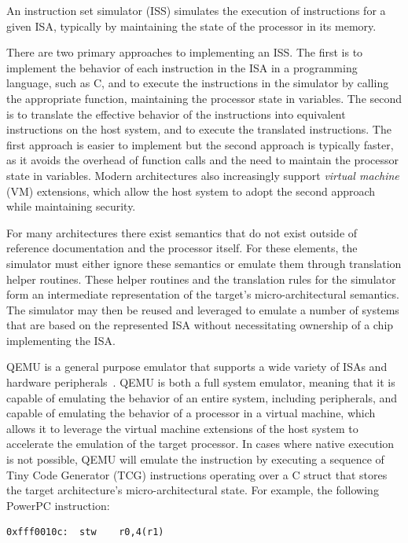 An instruction set simulator (ISS) simulates the execution of instructions for a given ISA, typically by maintaining the state of the processor in its memory.

There are two primary approaches to implementing an ISS.
The first is to implement the behavior of each instruction in the ISA in a programming language, such as C, and to execute the instructions in the simulator by calling the appropriate function, maintaining the processor state in variables.
The second is to translate the effective behavior of the instructions into equivalent instructions on the host system, and to execute the translated instructions.
The first approach is easier to implement but the second approach is typically faster, as it avoids the overhead of function calls and the need to maintain the processor state in variables.
Modern architectures also increasingly support \emph{virtual machine} (VM) extensions, which allow the host system to adopt the second approach while maintaining security.

For many architectures there exist semantics that do not exist outside of reference documentation and the processor itself.
For these elements, the simulator must either ignore these semantics or emulate them through translation helper routines.
These helper routines and the translation rules for the simulator form an intermediate representation of the target's micro-architectural semantics.
The simulator may then be reused and leveraged to emulate a number of systems that are based on the represented ISA without necessitating ownership of a chip implementing the ISA.

\begin{example}[QEMU]
\end{example}
QEMU is a general purpose emulator that supports a wide variety of ISAs and hardware peripherals~\cite{bellard2005qemu}.
QEMU is both a full system emulator, meaning that it is capable of emulating the behavior of an entire system, including peripherals, and capable of emulating the behavior of a processor in a virtual machine, which allows it to leverage the virtual machine extensions of the host system to accelerate the emulation of the target processor.
In cases where native execution is not possible, QEMU will emulate the instruction by executing a sequence of Tiny Code Generator (TCG) instructions operating over a C struct that stores the target architecture's micro-architectural state.
For example, the following PowerPC instruction:

\begin{center}
\begin{lstlisting}[]
0xfff0010c:  stw    r0,4(r1)
\end{lstlisting}
\end{center}

